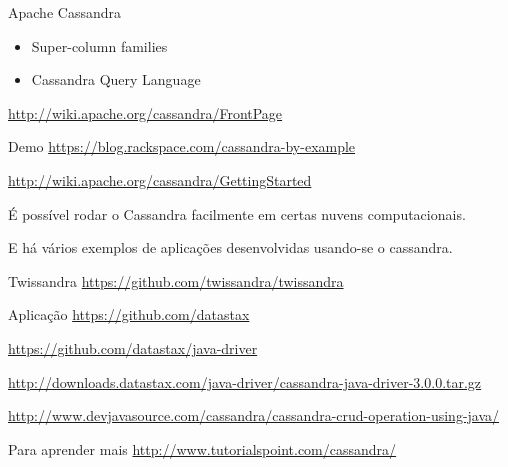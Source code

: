 \begin{frame}{Apache Cassandra}
\begin{itemize}
\item Super-column families

%           

\item Cassandra Query Language
\end{itemize}

\url{http://wiki.apache.org/cassandra/FrontPage}
\end{frame}


\begin{frame}{Demo}
\url{https://blog.rackspace.com/cassandra-by-example}

\url{http://wiki.apache.org/cassandra/GettingStarted}	
\end{frame}

É possível rodar o Cassandra facilmente em certas nuvens computacionais.


E há vários exemplos de aplicações desenvolvidas usando-se o cassandra.
\begin{frame}{Twissandra}
\url{https://github.com/twissandra/twissandra}
\end{frame}



\begin{frame}{Aplicação}
\url{https://github.com/datastax}

\url{https://github.com/datastax/java-driver}

\url{http://downloads.datastax.com/java-driver/cassandra-java-driver-3.0.0.tar.gz}

\url{http://www.devjavasource.com/cassandra/cassandra-crud-operation-using-java/}
\end{frame}


\begin{frame}{Para aprender mais}
\url{http://www.tutorialspoint.com/cassandra/}	
\end{frame}


